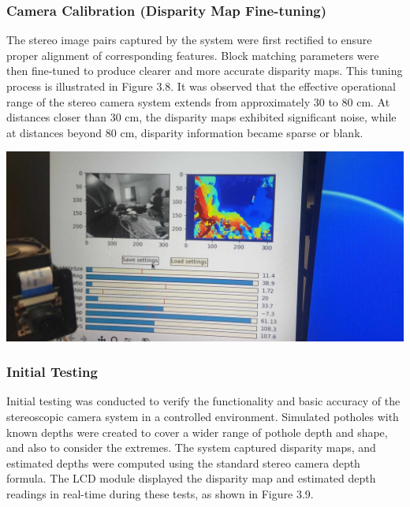 \subsubsection{Camera Calibration (Disparity  Map Fine-tuning)}
The stereo image pairs captured by the system were first rectified to ensure proper alignment of corresponding features. Block matching parameters were then fine-tuned to produce clearer and more accurate disparity maps. This tuning process is illustrated in Figure 3.8. It was observed that the effective operational range of the stereo camera system extends from approximately 30 to 80 cm. At distances closer than 30 cm, the disparity maps exhibited significant noise, while at distances beyond 80 cm, disparity information became sparse or blank.

\begin{center}
	\includegraphics[scale=0.15]{calibration2.jpg}
\end{center}

\subsubsection{Initial Testing}
Initial testing was conducted to verify the functionality and basic accuracy of the stereoscopic camera system in a controlled environment. Simulated potholes with known depths were created to cover a wider range of pothole depth and shape, and also to consider the extremes. The system captured disparity maps, and estimated depths were computed using the standard stereo camera depth formula. The LCD module displayed the disparity map and estimated depth readings in real-time during these tests, as shown in Figure 3.9.

